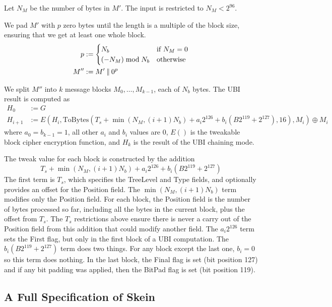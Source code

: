 \documentclass[11pt,twoside]{article}
\newcommand{\xor}{\oplus}
\newcommand{\concat}{\mathbin{|\hspace{-1pt}|}}
\def\symdef#1{\label{symdef:#1}}
\newcommand{\ToBytes}{\text{ToBytes}\xspace}
\begin{document}
Let $N_M$ be the number of bytes in $M'$. The input is restricted to $N_M < 2^{96}$.

We pad $M'$ with $p$ zero bytes until the length is a multiple of the block size, ensuring that we get at least one whole block.
\begin{align*}
  p &:= \begin{cases}
            N_b & \text{if $N_M=0$}\\
            (-N_M) \bmod N_b &\text{otherwise}
        \end{cases}\\
  M'' &:= M' \concat 0^p
\end{align*}

We split $M''$ into $k$ message blocks $M_0, \ldots, M_{k-1}$, each of $N_b$ bytes. The UBI result is computed as\symdef{H_i}
\begin{align*}
  H_0 &:= G\\
  H_{i+1} &:= E( H_{i}, \ToBytes( T_s + \min( N_M, (i+1)N_b) + a_i 2^{126} + b_i(B2^{119} + 2^{127}), 16), M_i ) \xor M_i
\end{align*}
where $a_0 = b_{k-1} = 1$, all other $a_i$ and $b_i$ values are 0, $E()$ is the tweakable block cipher encryption function, and $H_k$ is the result of the UBI chaining mode.

The tweak value for each block is constructed by the addition
\[
T_s + \min( N_M, (i+1)N_b) + a_i 2^{126} + b_i(B2^{119} + 2^{127})
\]
The first term is $T_s$, which specifies the TreeLevel and Type fields, and optionally provides an offset for the Position field. The $\min( N_M, (i+1)N_b)$ term modifies only the Position field. For each block, the Position field is the number of bytes processed so far, including all the bytes in the current block, plus the offset from $T_s$. The $T_s$ restrictions above ensure there is never a carry out of the Position field from this addition that could modify another field. The $a_i 2^{126}$ term sets the First flag, but only in the first block of a UBI computation. The $b_i (B 2^{119} + 2^{127})$ term does two things. For any block except the last one, $b_i = 0$ so this term does nothing. In the last block, the Final flag is set (bit position 127) and if any bit padding was applied, then the BitPad flag is set (bit position 119).

\subsection{A Full Specification of Skein}\label{sec:fullSkein}
\end{document}
